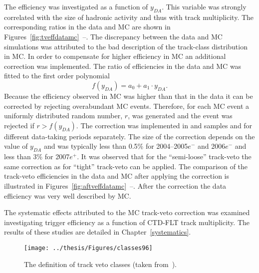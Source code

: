 The efficiency was investigated as a function of $y_{DA}$. This variable was strongly correlated with the size of hadronic activity and thus with track multiplicity. The corresponding ratios in the data and MC are shown in Figures~\ref{fig:tveffdatamc}~--. The discrepancy between the data and MC simulations was attributed to the bad description of the track-class distribution in MC. In order to compensate for higher efficiency in MC an additional correction was implemented. The ratio of efficiencies in the data and MC was fitted to the first order polynomial
\begin{equation} 
 f\left(y_{DA}\right)=a_0 + a_1 \cdot y_{DA}.
\end{equation}
Because the efficiency observed in MC was higher than that in the data it can be corrected by rejecting overabundant MC events. Therefore, for each MC event a uniformly distributed random number, $r$, was generated and the event was rejected if $r > f\left(y_{DA}\right)$. The correction was implemented in \lepto and \ariadne samples and for different data-taking periods separately. The size of the correction depends on the value of $y_{DA}$ and was typically less than 0.5\% for 2004--2005$e^-$ and 2006$e^-$ and less than 3\% for 2007$e^+$. It was observed that for the ``semi-loose'' track-veto the same correction as for ``tight'' track-veto can be applied. The comparison of the track-veto efficiencies in the data and MC after applying the correction is illustrated in Figures~\ref{fig:aftveffdatamc}~--. After the correction the data efficiency was very well described by MC. 

The systematic effects attributed to the MC track-veto correction was examined investigating trigger efficiency as a function of CTD-FLT track multiplicity. The results of these studies are detailed in Chapter~\ref{systematics}.
\begin{figure}[t]
  \begin{center}
    \texttt{[image: ../thesis/Figures/classes96]}
  \end{center}
  \caption{The definition of track veto classes (taken from~\cite{Yamazaki site}).}
  \label{fig:trackvetodefinition}
\end{figure}

